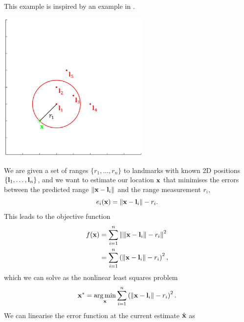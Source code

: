 \begin{example}[frametitle=Range-based localisation] \label{ex:range-based-localisation}
This example is inspired by an example in \cite{Boyd2017IntroductionSquares}.

{
  \centering
  \includegraphics[height=7.5cm]{figures/range-localisation-intro.png}
  \captionsetup{type=figure}
  \label{fig:range-localisation-intro}
  \par
}
We are given a set of ranges $\{r_1, \ldots, r_n\}$ to landmarks with known 2D positions $\{{\boldsymbol{\mathbf{l}}}_1, \ldots, {\boldsymbol{\mathbf{l}}}_n\}$, and we want to estimate our location ${\boldsymbol{\mathbf{x}}}$ that minimises the errors between the predicted range $\left\lVert{\boldsymbol{\mathbf{x}}} - {\boldsymbol{\mathbf{l}}}_i\right\rVert$ and the range measurement $r_i$,
\begin{equation}
  e_i({\boldsymbol{\mathbf{x}}}) = \left\lVert{\boldsymbol{\mathbf{x}}} - {\boldsymbol{\mathbf{l}}}_i\right\rVert - r_i.
\end{equation}
This leads to the objective function
\begin{align}
  f({\boldsymbol{\mathbf{x}}}) &= \sum^n_{i=1} \left\lVert\left\lVert{\boldsymbol{\mathbf{x}}} - {\boldsymbol{\mathbf{l}}}_i\right\rVert - r_i\right\rVert^2\\
  &= \sum^n_{i=1} \left( \left\lVert{\boldsymbol{\mathbf{x}}} - {\boldsymbol{\mathbf{l}}}_i\right\rVert - r_i \right)^2,
\end{align}
which we can solve as the nonlinear least squares problem
\begin{equation}
  {\boldsymbol{\mathbf{x}}}^\ast = \operatorname*{arg\,min}_{\boldsymbol{\mathbf{x}}} \sum^n_{i=1} \left( \left\lVert{\boldsymbol{\mathbf{x}}} - {\boldsymbol{\mathbf{l}}}_i\right\rVert - r_i \right)^2.
\end{equation}
We can linearise the error function at the current estimate $\hat{{\boldsymbol{\mathbf{x}}}}$ as
\begin{equation} \label{eq:linearised-range-error}

\end{equation}
\end{example}

